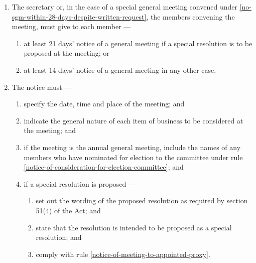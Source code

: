 \documentclass[../constitution.tex]{subfiles}
\begin{document}
\begin{enumerate}

\item The secretary or, in the case of a special general meeting convened under  \ref{no-sgm-within-28-days-despite-written-request}, the members convening the meeting, must give to each member ---

  \begin{enumerate}
  
  \item at least 21 days' notice of a general meeting if a special resolution is to be proposed at the meeting; or
  \item at least 14 days' notice of a general meeting in any other case.
  \end{enumerate}
\item The notice must ---

  \begin{enumerate}
  
  \item specify the date, time and place of the meeting; and
  \item indicate the general nature of each item of business to be considered at the meeting; and
  \item if the meeting is the annual general meeting, include the names of any members who have nominated for election to the committee under rule \ref{notice-of-consideration-for-election-committee}; and
  \item if a special resolution is proposed ---

    \begin{enumerate}
    
    \item set out the wording of the proposed resolution as required by section 51(4) of the Act; and
    \item state that the resolution is intended to be proposed as a special resolution; and
    \item comply with rule \ref{notice-of-meeting-to-appointed-proxy}.
    \end{enumerate}
  \end{enumerate}


\end{enumerate}
\end{document}
